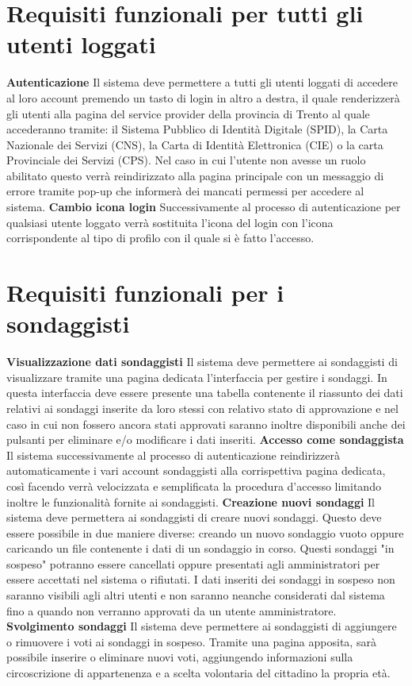     \section{Requisiti funzionali per tutti gli utenti loggati}
        \begin{rfList}
            \rfItem \textbf{Autenticazione} Il sistema deve permettere a tutti gli utenti loggati di accedere al loro account premendo un tasto di login in altro a destra, il quale renderizzerà gli utenti alla pagina del service provider della provincia di Trento al quale accederanno tramite: il Sistema Pubblico di Identità Digitale (SPID), la Carta Nazionale dei Servizi (CNS), la Carta di Identità Elettronica (CIE) o la carta Provinciale dei Servizi (CPS). Nel caso in cui l'utente non avesse un ruolo abilitato questo verrà reindirizzato alla pagina principale con un messaggio di errore tramite pop-up che informerà dei mancati permessi per accedere al sistema.
            \rfItem \textbf{Cambio icona login} Successivamente al processo di autenticazione per qualsiasi utente loggato verrà sostituita l'icona del login con l'icona corrispondente al tipo di profilo con il quale si è fatto l'accesso.
        \end{rfList}     
    \section{Requisiti funzionali per i sondaggisti}
        \begin{rfList}
            \rfItem \textbf{Visualizzazione dati sondaggisti} Il sistema deve permettere ai sondaggisti di visualizzare tramite una pagina dedicata l'interfaccia per gestire i sondaggi. In questa interfaccia deve essere presente una tabella contenente il riassunto dei dati relativi ai sondaggi inserite da loro stessi con relativo stato di approvazione e nel caso in cui non fossero ancora stati approvati saranno inoltre disponibili anche dei pulsanti per eliminare e/o modificare i dati inseriti.
            \rfItem \textbf{Accesso come sondaggista} Il sistema successivamente al processo di autenticazione reindirizzerà automaticamente i vari account sondaggisti alla corrispettiva pagina dedicata, così facendo verrà velocizzata e semplificata la procedura d'accesso limitando inoltre le funzionalità fornite ai sondaggisti.
            \rfItem \textbf{Creazione nuovi sondaggi} Il sistema deve permettera ai sondaggisti di creare nuovi sondaggi. Questo deve essere possibile in due maniere diverse: creando un nuovo sondaggio vuoto oppure caricando un file contenente i dati di un sondaggio in corso. Questi sondaggi "in sospeso" potranno essere cancellati oppure presentati agli amministratori per essere accettati nel sistema o rifiutati. I dati inseriti dei sondaggi in sospeso non saranno visibili agli altri utenti e non saranno neanche considerati dal sistema fino a quando non verranno approvati da un utente amministratore.
            \rfItem \textbf{Svolgimento sondaggi} Il sistema deve permettere ai sondaggisti di aggiungere o rimuovere i voti ai sondaggi in sospeso. Tramite una pagina apposita, sarà possibile inserire o eliminare nuovi voti, aggiungendo informazioni sulla circoscrizione di appartenenza e a scelta volontaria del cittadino la propria età.
        \end{rfList}
